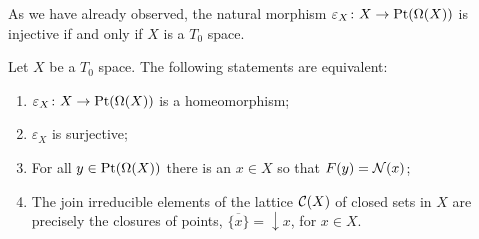 As we have already observed, the natural morphism $\varepsilon_X\colon X\to\mathrm{Pt}(\Omega(X))$ is injective if and only if $X$ is a $T_0$ space.

\begin{proposition}\label{prop:sober}
Let $X$ be a $T_0$ space. The following statements are equivalent:
\begin{enumerate}[label=(\roman*)]
\item $\varepsilon_X\colon X\to\mathrm{Pt}(\Omega(X))$ is a homeomorphism;
\item $\varepsilon_X$ is surjective;
\item For all $y\in\mathrm{Pt}(\Omega(X))$ there is an $x\in X$ so that  $ F(y)=\mathcal{N}(x)$;
\item The join irreducible elements of the lattice $\mathcal{C}(X)$ of closed sets in $X$ are precisely the closures of points, $\overline{\{x\}}={\downarrow} x$, for $x\in X$.
\end{enumerate}
\end{proposition}

